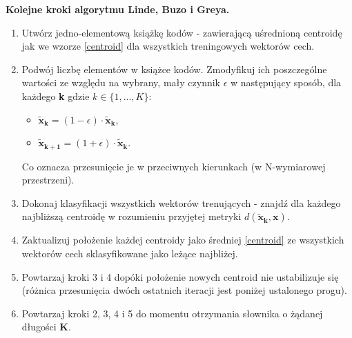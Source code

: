 \textbf{Kolejne kroki algorytmu Linde, Buzo i Greya.\cite{minidsp}}
\begin{enumerate}
  \item Utwórz jedno-elementową książkę kodów - zawierającą uśrednioną centroidę jak we wzorze \ref{centroid} dla wszystkich treningowych wektorów cech.
  \item Podwój liczbę elementów w książce kodów. Zmodyfikuj ich poszczególne wartości ze względu na wybrany, mały czynnik $\epsilon$ w następujący sposób, dla każdego \textbf{k} gdzie \textbf{$ k \in \{1,...,K\}$}:
    \begin{itemize}
      \item $ \bm{\tilde{x}_k} = (1 - \epsilon) \cdot \bm{\tilde{x}_k} $,
      \item $ \bm{\tilde{x}_{k+1}} = (1 + \epsilon) \cdot \bm{\tilde{x}_k} $.
    \end{itemize}
    Co oznacza przesunięcie je w przeciwnych kierunkach (w N-wymiarowej przestrzeni).
  \item Dokonaj klasyfikacji wszystkich wektorów trenujących - znajdź dla każdego najbliższą centroidę w rozumieniu przyjętej metryki $ d(\bm{\tilde{x}_k}, \bm{x})$. 
  \item Zaktualizuj położenie każdej centroidy jako średniej \ref{centroid} ze wszystkich wektorów cech sklasyfikowane jako leżące najbliżej.
  \item Powtarzaj kroki 3 i 4 dopóki położenie nowych centroid nie ustabilizuje się (różnica przesunięcia dwóch ostatnich iteracji jest poniżej ustalonego progu).
  \item Powtarzaj kroki 2, 3, 4 i 5 do momentu otrzymania słownika o żądanej długości \textbf{K}.
\end{enumerate}



